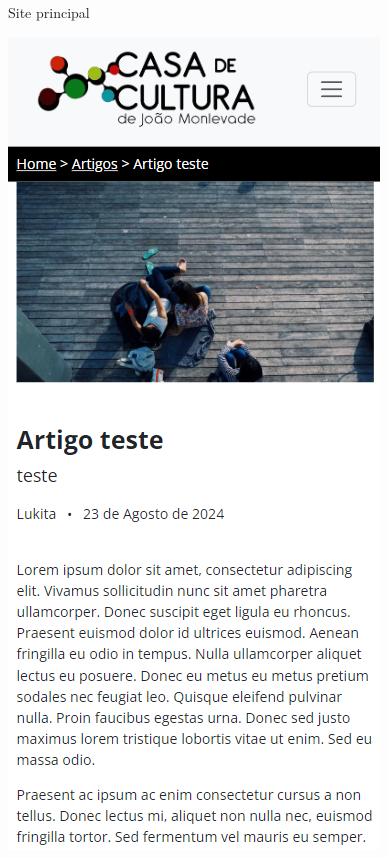\begin{frame}{Site principal}
\begin{center}
            \includegraphics[height=\textheight]{beamerthemesrc/assets/responsividade2.png}

\end{center}
\end{frame}
